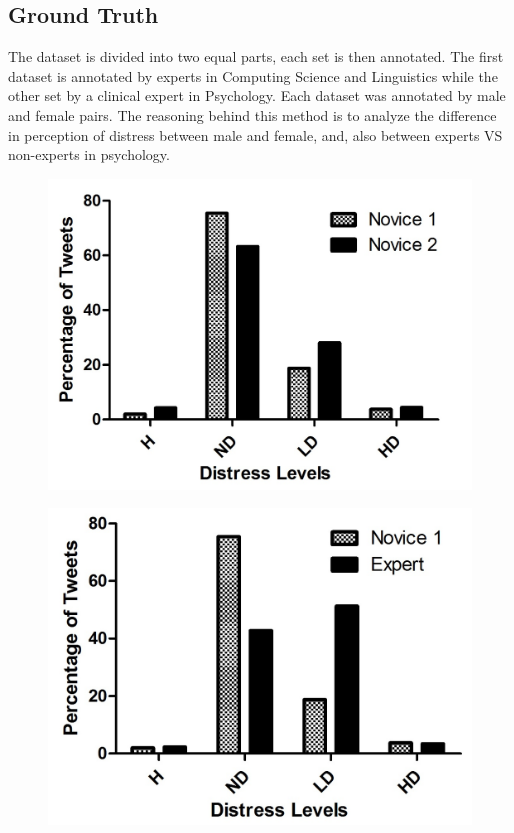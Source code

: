 \documentclass[11pt]{article}
\begin{document}
\subsection{Ground Truth}
The dataset is divided into two equal parts, each set is then annotated. The first dataset is annotated by experts in Computing Science and Linguistics while  the other set by a clinical expert in Psychology. Each dataset was annotated by male and female pairs. The reasoning behind this method is to analyze the difference in perception of distress between male and female, and, also between experts VS non-experts in psychology.

\begin{figure}
\centering
\includegraphics[scale=0.7]{ChrisCissi4cat.jpg}
\end{figure}

\begin{figure}
\centering
\includegraphics[scale=0.7]{ChrisMegan4Cat.jpg}
\end{figure}
\end{document}
